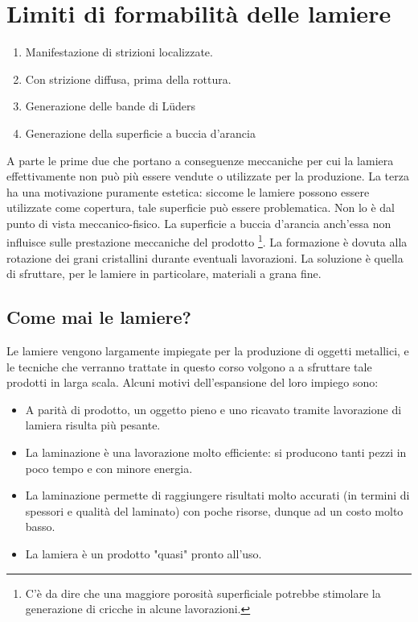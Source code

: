 \section{Limiti di formabilità delle lamiere}
\begin{enumerate}
\item Manifestazione di strizioni localizzate.
\item Con strizione diffusa, prima della rottura.
\item Generazione delle bande di Lüders
\item Generazione della superficie a buccia d'arancia
\end{enumerate}
A parte le prime due che portano a conseguenze meccaniche per cui la lamiera effettivamente non può più essere vendute o utilizzate per la produzione.
La terza ha una motivazione puramente estetica: siccome le lamiere possono essere utilizzate come copertura, tale superficie può essere problematica. Non lo è dal punto di vista meccanico-fisico.
La superficie a buccia d'arancia anch'essa non influisce sulle prestazione meccaniche del prodotto%
\footnote{C'è da dire che una maggiore porosità superficiale potrebbe stimolare la generazione di cricche in alcune lavorazioni.}.
La formazione è dovuta alla rotazione dei grani cristallini durante eventuali lavorazioni.
La soluzione è quella di sfruttare, per le lamiere in particolare, materiali a grana fine.

\subsection{Come mai le lamiere?}
Le lamiere vengono largamente impiegate per la produzione di oggetti metallici, e le tecniche che verranno trattate in questo corso volgono a a sfruttare tale prodotti in larga scala.
Alcuni motivi dell'espansione del loro impiego sono:
\begin{itemize}
\item A parità di prodotto, un oggetto pieno e uno ricavato tramite lavorazione di lamiera risulta più pesante.
\item La laminazione è una lavorazione molto efficiente: si producono tanti pezzi in poco tempo e con minore energia.
\item La laminazione permette di raggiungere risultati molto accurati (in termini di spessori e qualità del laminato) con poche risorse, dunque ad un costo molto basso.
\item La lamiera è un prodotto "quasi" pronto all'uso.
\end{itemize}


